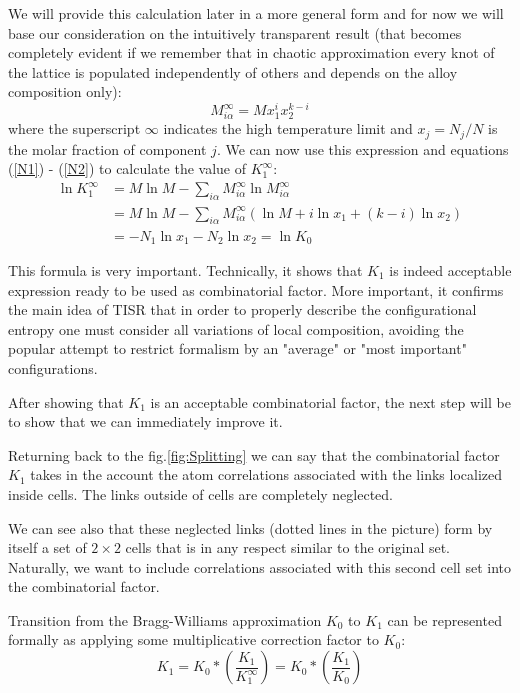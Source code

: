 \documentclass[12pt,abstract]{scrartcl}
\begin{document}
We will provide this calculation later in a more general form and for now we will base our consideration on the intuitively transparent result (that becomes completely evident if we remember that in chaotic approximation every knot of the lattice is populated independently of others and depends on the alloy composition only):
\[
M_{i\alpha}^\infty = M x_1^i x_2^{k-i}
\]
where the superscript $\infty$ indicates the high temperature limit and $x_j = N_j / N$ is the molar fraction of component $j$. We can now use this expression and equations (\ref{N1}) - (\ref{N2}) to calculate the value of $K_1^\infty$:
\[
\begin{split}
\ln{K_1^\infty} &= M \ln{M} - \sum_{i \alpha}M_{i\alpha}^\infty \ln{M_{i\alpha}^\infty}\\ &=  M \ln{M} - \sum_{i \alpha} M_{i\alpha}^\infty \left( \ln M + i \ln x_1 + (k-i) \ln x_2
\right)\\ &= - N_1 \ln x_1 - N_2 \ln x_2 = \ln K_0
\end{split}
\]

This formula is very important. Technically, it shows that $K_1$  is indeed acceptable expression ready to be used as  combinatorial  factor. More important, it confirms the main idea of TISR that in order to properly describe the configurational entropy one must consider all variations of local composition, avoiding the popular attempt to restrict formalism by an "average" or "most important" configurations.
   

After showing that $K_1$ is an acceptable combinatorial factor, the next step will be to show that we can immediately improve it.

Returning back to the fig.\ref{fig:Splitting} we can say that the combinatorial factor $K_1$ takes in the account the atom correlations associated with the links localized inside cells. The links outside of cells are completely neglected.

We can see also that these neglected links (dotted lines in the picture) form by itself a set of $2\times 2$ cells that is in any respect similar to the original set. Naturally, we want to include correlations associated with this second cell set into the combinatorial  factor.

Transition from the Bragg-Williams approximation $K_0$ to $K_1$ can be represented formally as applying some multiplicative correction factor to $K_0$:
\begin{equation} \label{config_1}
K_1 = K_0 * \left( \frac{K_1}{K_1^\infty} \right) =  K_0 * \left( \frac{K_1}{K_0} \right) 
\end{equation}
\end{document}
